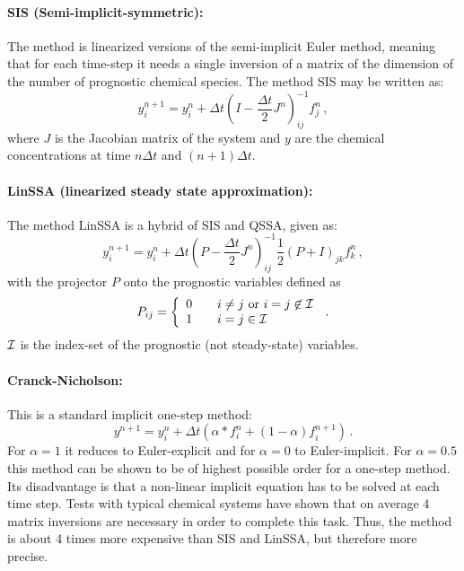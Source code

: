 \paragraph*{SIS (Semi-implicit-symmetric):} \citet{Ramaroson1992}
\par\noindent
The method is linearized versions of the semi-implicit Euler method,
meaning that for each time-step it needs a single inversion of a matrix
of the dimension of the number of prognostic chemical species.
The method SIS may be written as:
\begin{equation}
y_i^{n+1} = y_i^n + \Delta t\left({I}
          - \frac{\Delta t}2 {J}^n\right)_{ij}^{-1}f_j^n \,,
\end{equation}
where $J$ is the Jacobian matrix of the system and
$y$ are the chemical concentrations at time $n\Delta t$
and $(n+1)\Delta t$.

\paragraph*{LinSSA (linearized steady state approximation):}
\citet{Suhre1994}
\par\noindent
The method LinSSA is a hybrid of SIS and QSSA, given as:
\begin{equation}
y_i^{n+1} = y_i^n + \Delta t\left({P}
          - \frac{\Delta t}2 {J}^n\right)_{ij}^{-1}
          \frac12({P}+{I})_{jk}f_k^n \,,
\end{equation}
with the projector ${P}$ onto the prognostic variables defined as
\begin{equation}
P_{ij} =
\left\{
  \begin{array}{ll}
    0\quad&i\ne j\,\, \hbox{\rm or}\,\, i=j\not\in {\cal I}\cr
    1\quad&i=j\in {\cal I}\cr
  \end{array}
\right.  \,.
\end{equation}
$\cal I$ is the index-set of the prognostic (not steady-state) variables.

\paragraph*{Cranck-Nicholson:} \citet{Stoer1978}
\par\noindent
This is a standard implicit one-step method:
\begin{equation}
y^{n+1} = y_i^n + \Delta t\left( 
                      \alpha * f_i^n  + (1-\alpha) f_i^{n+1}\right)
\,.
\end{equation}
For $\alpha=1$ it reduces to Euler-explicit and for $\alpha=0$ to 
Euler-implicit. For $\alpha=0.5$ this method can be shown to be of
highest possible order for a one-step method.
Its disadvantage is that a non-linear implicit equation has to
be solved at each time step. Tests with typical chemical systems
have shown that on average 4 matrix inversions are necessary in order
to complete this task. Thus, the method is about 4 times more expensive
than SIS and LinSSA, but therefore more precise.

